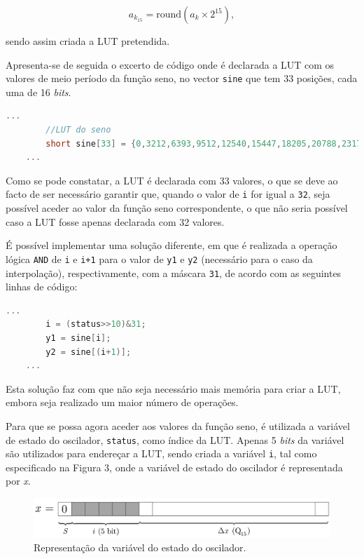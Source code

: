 \documentclass[11pt]{article}
\numberwithin{equation}{section}
\begin{document}
\vspace{-3mm}
\begin{equation}
a_{k_{15}} = \text{round}\left(a_{k} \times 2^{15} \right),
\end{equation} 

\vspace{1mm}
sendo assim criada a LUT pretendida.

Apresenta-se de seguida o excerto de código onde é declarada a LUT com os valores de meio período da função seno, no vector \texttt{sine} que tem 33 posições, cada uma de 16 \textit{bits}. 

\begin{lstlisting}[language=C]
	...
		//LUT do seno
		short sine[33] = {0,3212,6393,9512,12540,15447,18205,20788,23170,25330,27246,28899,30274,31357,		32138,32610,32767,32610,32138,31357,30274,28899,27246,25330,23170,20788,18205,	15447,12540,9512,6393,3212,0}; 
	...
\end{lstlisting}

Como se pode constatar, a LUT é declarada com 33 valores, o que se deve ao facto de ser necessário garantir que, quando o valor de \texttt{i} for igual a \texttt{32}, seja possível aceder ao valor da função seno correspondente, o que não seria possível caso a LUT fosse apenas declarada com 32 valores.
 
É possível implementar uma solução diferente, em que é realizada a operação lógica \texttt{AND} de \texttt{i} e \texttt{i+1} para o valor de \texttt{y1} e \texttt{y2} (necessário para o caso  da interpolação), 
respectivamente, com a máscara \texttt{31}, de acordo com as seguintes linhas de código:

\begin{lstlisting}[language=C]
	...
		i = (status>>10)&31;
		y1 = sine[i];
		y2 = sine[(i+1)];
	...
\end{lstlisting}

Esta solução faz com que não seja necessário mais memória para criar a LUT, embora seja realizado um maior número de operações.  

Para que se possa agora aceder aos valores da função seno, é utilizada a variável de estado do oscilador, \texttt{status}, como índice da LUT. Apenas 5 \textit{bits} da variável são utilizados para endereçar a LUT, sendo criada a variável \texttt{i}, tal como especificado na Figura 3, onde a variável de estado do oscilador é representada por \textit{x}.

\begin{figure}[H]
	\centering
	\includegraphics[keepaspectratio=true, scale=0.27]{teoricas/seno}
	\caption{Representação da variável do estado do oscilador.}
	\vspace{-0.8em}
	\label{fig:variavelestado}
\end{figure}
\end{document}
